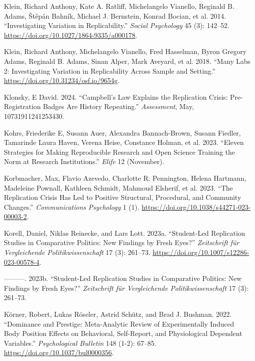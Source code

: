 \documentclass[
  letterpaper,
  DIV=11,
  numbers=noendperiod]{scrreprt}
\newlength{\cslhangindent}
\newenvironment{CSLReferences}[2] %
 {\begin{list}{}{%
  \setlength{\itemindent}{0pt}
  \setlength{\leftmargin}{0pt}
  \setlength{\parsep}{0pt}
  \ifodd #1
   \setlength{\leftmargin}{\cslhangindent}
   \setlength{\itemindent}{-1\cslhangindent}
  \fi
  \setlength{\itemsep}{#2\baselineskip}}}
 {\end{list}}
\begin{document}
\begin{CSLReferences}{1}{0}
Klein, Richard Anthony, Kate A. Ratliff, Michelangelo Vianello, Reginald
B. Adams, Štěpán Bahník, Michael J. Bernstein, Konrad Bocian, et al.
2014. {``Investigating Variation in Replicability.''} \emph{Social
Psychology} 45 (3): 142--52.
\url{https://doi.org/10.1027/1864-9335/a000178}.

Klein, Richard Anthony, Michelangelo Vianello, Fred Hasselman, Byron
Gregory Adams, Reginald B. Adams, Sinan Alper, Mark Aveyard, et al.
2018. {``Many Labs 2: Investigating Variation in Replicability Across
Sample and Setting.''} \url{https://doi.org/10.31234/osf.io/9654g}.

Klonsky, E David. 2024. {``Campbell's Law Explains the Replication
Crisis: Pre-Registration Badges Are History Repeating.''}
\emph{Assessment}, May, 10731911241253430.

Kohrs, Friederike E, Susann Auer, Alexandra Bannach-Brown, Susann
Fiedler, Tamarinde Laura Haven, Verena Heise, Constance Holman, et al.
2023. {``Eleven Strategies for Making Reproducible Research and Open
Science Training the Norm at Research Institutions.''} \emph{Elife} 12
(November).

Korbmacher, Max, Flavio Azevedo, Charlotte R. Pennington, Helena
Hartmann, Madeleine Pownall, Kathleen Schmidt, Mahmoud Elsherif, et al.
2023. {``The Replication Crisis Has Led to Positive Structural,
Procedural, and Community Changes.''} \emph{Communications Psychology} 1
(1). \url{https://doi.org/10.1038/s44271-023-00003-2}.

Korell, Daniel, Niklas Reinecke, and Lars Lott. 2023a. {``Student-Led
Replication Studies in Comparative Politics: New Findings by Fresh
Eyes?''} \emph{Zeitschrift f{ü}r Vergleichende Politikwissenschaft} 17
(3): 261--73. \url{https://doi.org/10.1007/s12286-023-00578-4}.

---------. 2023b. {``Student-Led Replication Studies in Comparative
Politics: New Findings by Fresh Eyes?''} \emph{Zeitschrift f{ü}r
Vergleichende Politikwissenschaft} 17 (3): 261--73.

Körner, Robert, Lukas Röseler, Astrid Schütz, and Brad J. Bushman. 2022.
{``Dominance and Prestige: Meta-Analytic Review of Experimentally
Induced Body Position Effects on Behavioral, Self-Report, and
Physiological Dependent Variables.''} \emph{Psychological Bulletin} 148
(1-2): 67--85. \url{https://doi.org/10.1037/bul0000356}.


\end{CSLReferences}
\end{document}
